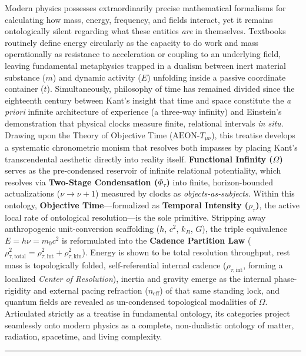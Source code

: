 \documentclass[
]{article}
\begin{document}
Modern physics possesses extraordinarily precise mathematical formalisms
for calculating how mass, energy, frequency, and fields interact, yet it
remains ontologically silent regarding what these entities \emph{are} in
themselves. Textbooks routinely define energy circularly as the capacity
to do work and mass operationally as resistance to acceleration or
coupling to an underlying field, leaving fundamental metaphysics trapped
in a dualism between inert material substance (\(m\)) and dynamic
activity (\(E\)) unfolding inside a passive coordinate container
(\(t\)). Simultaneously, philosophy of time has remained divided since
the eighteenth century between Kant's insight that time and space
constitute the \emph{a priori} infinite architecture of experience (a
three-way infinity) and Einstein's demonstration that physical clocks
measure finite, relational intervals \emph{in situ}. Drawing upon the
Theory of Objective Time (\(\text{AEON-}T_{\mu\nu}\)), this treatise
develops a systematic chronometric monism that resolves both impasses by
placing Kant's transcendental aesthetic directly into reality itself.
\textbf{Functional Infinity (\(\Omega\))} serves as the pre-condensed
reservoir of infinite relational potentiality, which resolves via
\textbf{Two-Stage Condensation (\(\Phi_\tau\))} into finite,
horizon-bounded actualizations (\(\nu \to \nu + 1\)) measured by clocks
as \emph{objects-as-subjects}. Within this ontology, \textbf{Objective
Time}---formalized as \textbf{Temporal Intensity (\(\rho_\tau\))}, the
active local rate of ontological resolution---is the sole primitive.
Stripping away anthropogenic unit-conversion scaffolding (\(h\),
\(c^2\), \(k_B\), \(G\)), the triple equivalence \(E = h\nu = m_0 c^2\)
is reformulated into the \textbf{Cadence Partition Law}
(\(\rho_{\tau,\text{total}}^2 = \rho_{\tau,\text{int}}^2 + \rho_{\tau,\text{kin}}^2\)).
Energy is shown to be total resolution throughput, rest mass is
topologically folded, self-referential internal cadence
(\(\rho_{\tau,\text{int}}\), forming a localized \emph{Center of
Resolution}), inertia and gravity emerge as the internal phase-rigidity
and external pacing refraction (\(n_{\text{eff}}\)) of that same
standing lock, and quantum fields are revealed as un-condensed
topological modalities of \(\Omega\). Articulated strictly as a treatise
in fundamental ontology, its categories project seamlessly onto modern
physics as a complete, non-dualistic ontology of matter, radiation,
spacetime, and living complexity.

\begin{center}\rule{0.5\linewidth}{0.5pt}\end{center}
\end{document}
